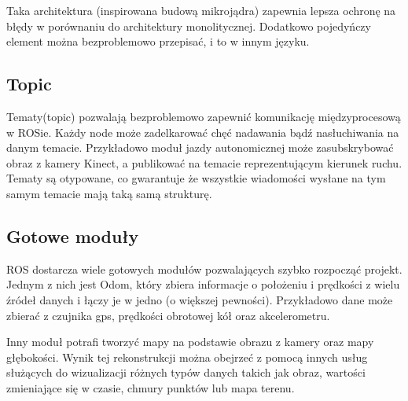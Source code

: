 Taka architektura (inspirowana budową mikrojądra) zapewnia lepsza ochronę na błędy
w porównaniu do architektury monolitycznej. Dodatkowo pojedyńczy element można
bezproblemowo przepisać, i to w innym języku.
\subsection{Topic}
Tematy(topic) pozwalają bezproblemowo zapewnić komunikację międzyprocesową
w ROSie. Każdy node może zadelkarować chęć nadawania bądź nasłuchiwania na
danym temacie. Przykładowo moduł jazdy autonomicznej może zasubskrybować
obraz z kamery Kinect, a publikować na temacie reprezentującym kierunek ruchu.
Tematy są otypowane, co gwarantuje że wszystkie wiadomości wysłane na tym
samym temacie mają taką samą strukturę.
\subsection{Gotowe moduły}
ROS dostarcza wiele gotowych modułów pozwalających szybko rozpocząć projekt.
Jednym z nich jest Odom, który zbiera informacje o położeniu i prędkości 
z wielu źródeł danych i łączy je w jedno (o większej pewności). Przykładowo 
dane może zbierać z czujnika gps, prędkości obrotowej kół oraz akcelerometru.

Inny moduł potrafi tworzyć mapy na podstawie obrazu z kamery oraz mapy głębokości.
Wynik tej rekonstrukcji można obejrzeć z pomocą innych usług służących do 
wizualizacji różnych typów danych takich jak obraz, wartości zmieniające się
w czasie, chmury punktów lub mapa terenu.

